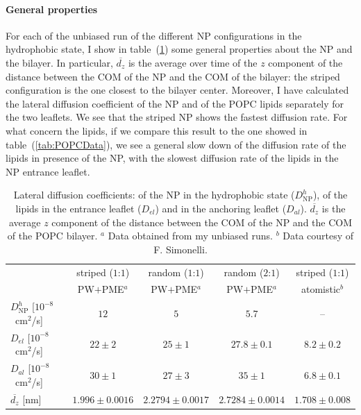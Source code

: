 \paragraph{\textbf{General properties}} For each of the unbiased run of the different \ac{NP} configurations in the hydrophobic state, I show in table~(\ref{tab:NPMembProperties}) some general properties about the \ac{NP} and the bilayer. In particular, $\overline{d_z}$ is the average over time of the $z$ component of the distance between the \ac{COM} of the \ac{NP} and the \ac{COM} of the bilayer: the striped configuration is the one closest to the bilayer center. Moreover, I have calculated the lateral diffusion coefficient of the \ac{NP} and of the \ac{POPC} lipids separately for the two leaflets. We see that the striped \ac{NP} shows the fastest diffusion rate. For what concern the lipids, if we compare this result to the one showed in table~(\ref{tab:POPCData}), we see a general slow down of the diffusion rate of the lipids in presence of the \ac{NP}, with the slowest diffusion rate of the lipids in the \ac{NP} entrance leaflet.
\begin{table}[h!t]
	\centering\footnotesize
	\begin{tabular}{lcccc}
		\toprule
		\,		& striped ($1$:$1$)		& random ($1$:$1$)		& random ($2$:$1$)	& striped ($1$:$1$)	\\
		\,		& \acs{PW}$+$\acs{PME}$^a$ & \acs{PW}$+$\acs{PME}$^a$ & \acs{PW}$+$\acs{PME}$^a$ & atomistic$^b$ \\ \toprule
		$D^h_{\text{NP}}$ [$10^{-8}$~cm$^2$/s] & $12$ & $5$ & $5.7$ & –		 \\ \midrule
		$D_{el}$ [$10^{-8}$~cm$^2$/s] & $22 \pm 2$ & $25 \pm 1$ & $27.8 \pm 0.1$ & $8.2 \pm 0.2$	\\ \midrule
		$D_{al}$ [$10^{-8}$~cm$^2$/s] & $30 \pm 1$ & $27 \pm 3$	& $35 \pm 1$	& $6.8 	\pm 0.1$		\\ \midrule
		$\overline{d_z}$ [nm] & $1.996 \pm 0.0016$	& $2.2794 \pm 0.0017$	& $2.7284 \pm 0.0014$	& $1.708 \pm 0.008$\\ \bottomrule
	\end{tabular}
	\caption{Lateral diffusion coefficients: of the \acs{NP} in the hydrophobic state ($D^h_\text{NP}$), of the lipids in the entrance leaflet ($D_{el}$) and in the anchoring leaflet ($D_{al}$). $\overline{d_z}$ is the average $z$ component of the distance between the \acs{COM} of the \acs{NP} and the \acs{COM} of the \acs{POPC} bilayer. $^a$ Data obtained from my unbiased runs. $^b$ Data courtesy of F. Simonelli.}%
	\label{tab:NPMembProperties}
\end{table}

